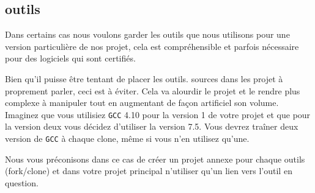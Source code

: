 	\subsection{outils}
		Dans certains cas nous voulons garder les outils que nous utilisons pour une version particulière de nos projet, cela est compréhensible et parfois nécessaire pour des logiciels qui sont certifiés.

		Bien qu'il puisse être tentant de placer les outils. sources dans les projet à proprement parler, ceci est à éviter. Cela va alourdir le projet et le rendre plus complexe à manipuler tout en augmentant de façon artificiel son volume. Imaginez que vous utilisiez \verb+GCC+ 4.10 pour la version 1 de votre projet et que pour la version deux vous décidez d'utiliser la version 7.5. Vous devrez traîner deux version de \verb+GCC+ à chaque clone, même si vous n'en utilisez qu'une.

		Nous vous préconisons dans ce cas de créer un projet annexe pour chaque outils (fork/clone) et dans votre projet principal n'utiliser qu'un lien vers 
		l’outil en question.
